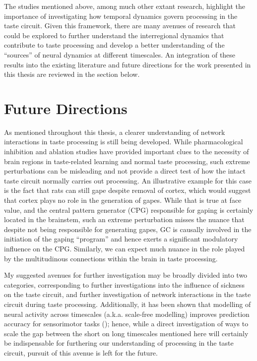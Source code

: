 \begin{refsection}
The studies mentioned above, among much other extant research, highlight the importance of investigating how temporal dynamics govern processing in the taste circuit. Given this framework, there are many avenues of research that could be explored to further understand the interregional dynamics that contribute to taste processing and develop a better understanding of the “sources” of neural dynamics at different timescales. An integration of these results into the existing literature and future directions for the work presented in this thesis are reviewed in the section below.

\section{Future Directions}
As mentioned throughout this thesis, a clearer understanding of network interactions in taste processing is still being developed. While pharmacological inhibition and ablation studies have provided important clues to the necessity of brain regions in taste-related learning and normal taste processing, such extreme perturbations can be misleading and not provide a direct test of how the intact taste circuit normally carries out processing. An illustrative example for this case is the fact that rats can still gape despite removal of cortex, which would suggest that cortex plays no role in the generation of gapes. While that is true at face value, and the central pattern generator (CPG) responsible for gaping is certainly located in the brainstem, such an extreme perturbation misses the nuance that despite not being responsible for generating gapes, GC is causally involved in the initiation of the gaping “program” and hence exerts a significant modulatory influence on the CPG. Similarly, we can expect much nuance in the role played by the multitudinous connections within the brain in taste processing.

My suggested avenues for further investigation may be broadly divided into two categories, corresponding to further investigations into the influence of sickness on the taste circuit, and further investigation of network interactions in the taste circuit during taste processing. Additionally, it has been shown that modelling of neural activity across timescales (a.k.a. scale-free modelling) improves prediction accuracy for sensorimotor tasks (\cite{samek2016a,abbaspourazad2021a}); hence, while a direct investigation of ways to scale the gap between the short on long timescales mentioned here will certainly be indispensable for furthering our understanding of processing in the taste circuit, pursuit of this avenue is left for the future.


\end{refsection}
